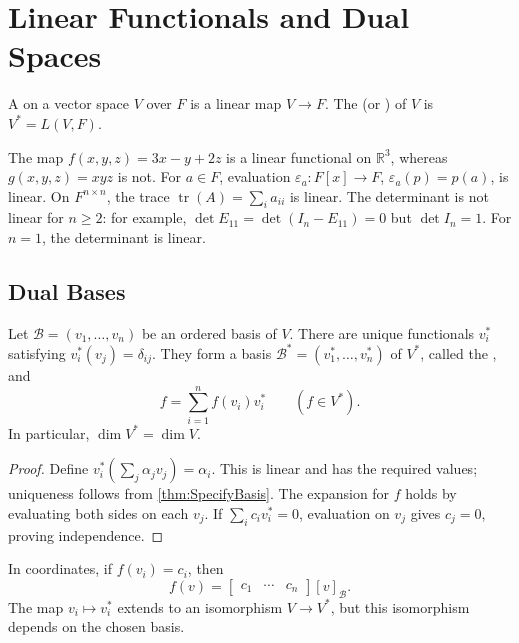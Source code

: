 
\section{Linear Functionals and Dual Spaces}\label{sec:Duality}

\begin{Definition}
A  on a vector space $V$ over $F$ is a linear map $V\to F$. The  (or ) of $V$ is $V^*=L(V,F)$.
\end{Definition}

\begin{Example}
The map $f(x,y,z)=3x-y+2z$ is a linear functional on $\mathbb R^3$, whereas $g(x,y,z)=xyz$ is not. For $a\in F$, evaluation $\varepsilon_a\colon F[x]\to F$, $\varepsilon_a(p)=p(a)$, is linear. On $F^{n\times n}$, the trace $\operatorname{tr}(A)=\sum_i a_{ii}$ is linear. The determinant is not linear for $n\ge2$: for example, $\det E_{11}=\det(I_n-E_{11})=0$ but $\det I_n=1$. For $n=1$, the determinant is linear.
\end{Example}

\subsection{Dual Bases}

\begin{Theorem}\label{thm:DualBasis}
Let $\mathcal B=(v_1,\ldots,v_n)$ be an ordered basis of $V$. There are unique functionals $v_i^*$ satisfying $v_i^*(v_j)=\delta_{ij}$. They form a basis $\mathcal B^*=(v_1^*,\ldots,v_n^*)$ of $V^*$, called the , and
\begin{equation*}
f=\sum_{i=1}^n f(v_i)v_i^*\qquad(f\in V^*).
\end{equation*}
In particular, $\dim V^*=\dim V$.
\end{Theorem}
\begin{proof}
Define $v_i^*(\sum_j\alpha_jv_j)=\alpha_i$. This is linear and has the required values; uniqueness follows from \cref{thm:SpecifyBasis}. The expansion for $f$ holds by evaluating both sides on each $v_j$. If $\sum_i c_iv_i^*=0$, evaluation on $v_j$ gives $c_j=0$, proving independence.
\end{proof}

In coordinates, if $f(v_i)=c_i$, then
\begin{equation*}
f(v)=\begin{bmatrix}c_1&\cdots&c_n\end{bmatrix}[v]_{\mathcal B}.
\end{equation*}
The map $v_i\mapsto v_i^*$ extends to an isomorphism $V\to V^*$, but this isomorphism depends on the chosen basis.

